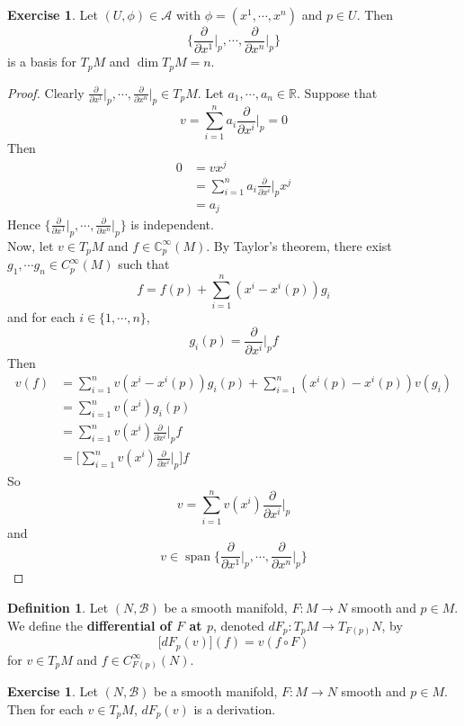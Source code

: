 \documentclass{book}
\theoremstyle{definition}
\newtheorem{defn}[definition]{Definition}
\newtheorem{ex}[definition]{Exercise}
\newcommand{\C}{\mathbb{C}}
\newcommand{\R}{\mathbb{R}}
\newcommand{\MA}{\mathcal{A}}
\newcommand{\MB}{\mathcal{B}}
\DeclareMathOperator{\spn}{span}
\DeclareMathOperator*{\0}{\mbf{0}}
\DeclareMathOperator*{\1}{\mbf{1}}
\newcommand{\p}{\partial}
\begin{document}
	\begin{ex}
		Let $(U, \phi) \in \MA$ with $\phi = (x^1, \cdots, x^n)$ and $p \in U$. Then $$ \bigg \{\frac{\p}{\p x^1} \bigg|_p, \cdots, \frac{\p}{\p x^n} \bigg|_p \bigg \}$$ is a basis for $T_pM$ and $\dim T_pM = n$.
	\end{ex}

	\begin{proof}
		Clearly $\frac{\p}{\p x^1} \bigg|_p, \cdots, \frac{\p}{\p x^n} \bigg|_p \in T_pM$. Let $a_1, \cdots, a_n \in \R$. Suppose that $$v = \sum_{i=1}^n a_i \frac{\p}{\p x^i} \bigg |_p  = 0$$
		Then 
		\begin{align*}
			0
			&= v x^j \\
			&= \sum_{i=1}^n a_i \frac{\p}{\p x^i} \bigg |_p  x^j \\
			&= a_j
		\end{align*}
		Hence $\bigg \{\frac{\p}{\p x^1} \bigg|_p, \cdots, \frac{\p}{\p x^n} \bigg|_p \bigg \}$ is independent.\\
		Now, let $v \in T_pM$ and $f \in \C^{\infty}_p(M)$. By Taylor's theorem, there exist $g_1, \cdots g_n \in C_p^{\infty}(M)$ such that $$f = f(p) + \sum_{i=1}^n(x^i - x^i(p)) g_i$$ and for each $i \in \{1, \cdots, n\}$, $$g_i(p) = \frac{\p}{\p x^i} \bigg |_p  f $$ Then 
		\begin{align*}
			v(f)
			&= \sum_{i=1}^nv(x^i - x^i(p)) g_i(p) + \sum_{i=1}^n(x^i(p) - x^i(p)) v(g_i) \\
			&= \sum_{i=1}^nv(x^i)g_i(p) \\
			&= \sum_{i=1}^nv(x^i)\frac{\p}{\p x^i} \bigg |_p  f \\
			&= \bigg[ \sum_{i=1}^nv(x^i)\frac{\p}{\p x^i} \bigg |_p  \bigg] f
		\end{align*}
		So $$v = \sum_{i=1}^nv(x^i)\frac{\p}{\p x^i} \bigg |_p  $$ and $$v \in \spn \bigg \{\frac{\p}{\p x^1} \bigg|_p, \cdots, \frac{\p}{\p x^n} \bigg|_p \bigg \}$$
	\end{proof}



	\begin{defn}
		Let $(N, \MB)$ be a smooth manifold, $F: M \rightarrow N$ smooth and $p \in M$. We define the \textbf{differential of $F$ at $p$}, denoted $dF_p: T_pM \rightarrow T_{F(p)}N$, by $$\bigg[ dF_p(v) \bigg] (f) = v (f \circ F)$$  for $v \in T_pM$ and $f \in C^{\infty}_{F(p)}(N)$.
	\end{defn}
	
	
	
	\begin{ex}
	Let $(N, \MB)$ be a smooth manifold, $F: M \rightarrow N$ smooth and $p \in M$. Then for each $v \in T_pM$, $dF_p(v)$ is a derivation.
	\end{ex}
	
\end{document}

